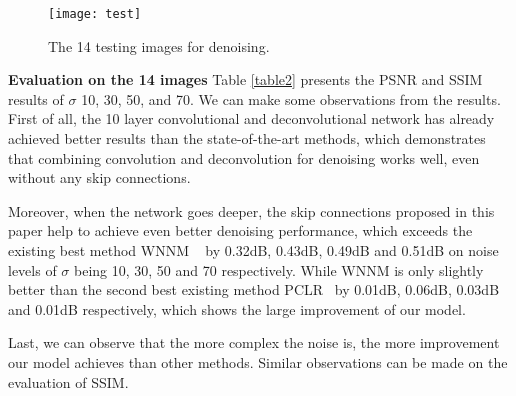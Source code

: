 \begin{figure}
\centering
\texttt{[image: test]}
\caption{The 14 testing images for denoising.}
\label{fig12}
\end{figure}


{\bf{Evaluation on the 14 images}}  Table \ref{table2} presents the PSNR and SSIM
results of $\sigma$ 10, 30, 50, and 70. We can make some observations from the results.
First of all, the 10 layer convolutional and deconvolutional network has already achieved
better results than the state-of-the-art methods, which demonstrates that combining
convolution and deconvolution for denoising works well, even without any skip connections.

Moreover, when the network goes deeper, the skip connections proposed in this paper help to
achieve even better denoising performance, which exceeds the existing best method WNNM
~\cite{DBLP:conf/cvpr/GuZZF14} by 0.32dB, 0.43dB, 0.49dB and 0.51dB on noise levels of $\sigma$
being 10, 30, 50 and 70 respectively. While WNNM is only slightly better than the second
best existing method PCLR~\cite{DBLP:conf/iccv/ChenZY15} by 0.01dB, 0.06dB, 0.03dB and 0.01dB
respectively, which shows the large improvement of our model.

Last, we can observe that the
more complex the noise is, the more improvement our model achieves than other methods.
Similar observations can be made on the evaluation of SSIM.

